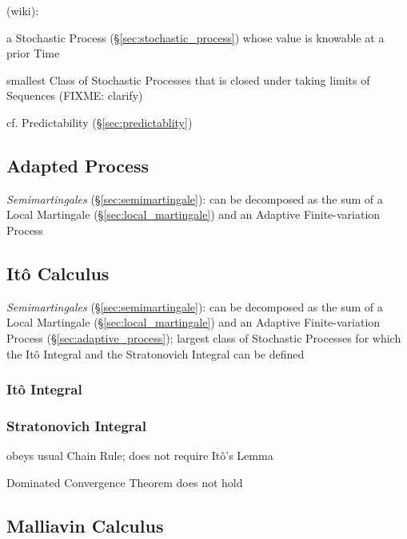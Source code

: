 (wiki):

a Stochastic Process (\S\ref{sec:stochastic_process}) whose value is knowable at
a prior Time

smallest Class of Stochastic Processes that is closed under taking limits of
Sequences (FIXME: clarify)

cf. Predictability (\S\ref{sec:predictablity})



\subsection{Adapted Process}\label{sec:adapted_process}

\fist \emph{Semimartingales} (\S\ref{sec:semimartingale}): can be decomposed as
the sum of a Local Martingale (\S\ref{sec:local_martingale}) and an Adaptive
Finite-variation Process



\subsection{It\^o Calculus}\label{sec:ito_calculus}

\emph{Semimartingales} (\S\ref{sec:semimartingale}): can be decomposed as the
sum of a Local Martingale (\S\ref{sec:local_martingale}) and an Adaptive
Finite-variation Process (\S\ref{sec:adaptive_process});
largest class of Stochastic Processes for which the It\^o Integral and the
Stratonovich Integral can be defined



\subsubsection{It\^o Integral}\label{sec:ito_integral}

\subsubsection{Stratonovich Integral}\label{sec:stratonovich_integral}

obeys usual Chain Rule; does not require It\^o's Lemma

Dominated Convergence Theorem does not hold



\subsection{Malliavin Calculus}\label{sec:malliavin_calculus}
